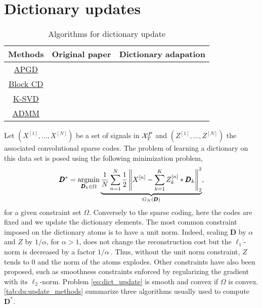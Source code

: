\documentclass[../thesis.tex]{subfiles}
\begin{document}
\def\sbiblio{}


\section{Dictionary updates}
\label{sec:dict_update}



\begin{table}[t]
    \centering
	\begin{tabular}{|c | c | c |}\hline
		Methods & {Original paper} & Dictionary adapation\\\hline
		\hyperref[sub:du_pgd]{APGD} & \citealt{Nesterov1983} & \citealt{Kavukcuoglu2013} \\\hline
		\hyperref[sub:block_cd]{Block CD} & \citealt{Luo1993} & \citealt{Mairal2010}\\\hline
		\hyperref[sub:du:ksvd]{K-SVD} & \citealt{Aharon2006} & \citealt{Yellin2017} \\\hline
		\hyperref[sub:du_admm]{ADMM} & \citealt{Gabay1976} & \citealt{Bristow2013} \\\hline
	\end{tabular}
	\caption{
	Algorithms for dictionary update}
\label{tab:du:update_methods}
\end{table}



	Let $\left(X^{[1]}, \dots, X^{[N]}\right)$ be a set of signals in ${\mathcal X}_T^P$
	and $\left(Z^{[1]}, \dots, Z^{[N]}\right)$  the associated convolutional sparse codes.
	The problem of learning a dictionary on this data set is posed using the following
	minimization problem,
	\begin{equation}
		\label{eq:dict_update}
		\pmb D^* = \operatorname*{\arg\!\min}_{\pmb D_k \in \Omega}
			\underbrace{\frac{1}{N}\sum_{n=1}^N\frac{1}{2} \left\|X^{[n]} - \sum_{k=1}^KZ^{[n]}_k* \pmb D_k\right\|_2^2
					    }_{G_N(\pmb D)},
	\end{equation}
	for a given constraint set $\Omega$. Conversely to the sparse coding, here
	the codes are fixed and we update the dictionary elements. The most common constraint
	imposed on the dictionary atoms is to have a unit norm. Indeed, scaling $\pmb D$ by
	$\alpha$ and $Z$ by $1/\alpha$, for $\alpha > 1$, does not change the reconstruction
	cost but the $\ell_1$-norm is decreased by a factor $1/\alpha~.$ Thus, without the unit
	norm constraint, $Z$ tends to 0 and the norm of the atoms explodes. Other constraints
	have also been proposed, such as smoothness constraints enforced by regularizing the
	gradient with its $\ell_2$-norm. Problem \autoref{eq:dict_update} is smooth and
	convex if $\Omega$ is convex. \autoref{tab:du:update_methods} summarize three algorithms
	usually used to compute $\pmb D^*$.
\end{document}
